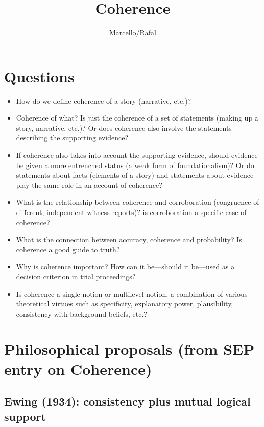 \documentclass[
  11pt,
  dvipsnames,enabledeprecatedfontcommands]{scrartcl}
\title{Coherence}
\author{Marcello/Rafal}
\date{}
\begin{document}
\maketitle

\hypertarget{questions}{%
\section{Questions}\label{questions}}

\begin{itemize}
\item
  How do we define coherence of a story (narrative, etc.)?
\item
  Coherence of what? Is just the coherence of a set of statements
  (making up a story, narrative, etc.)? Or does coherence also involve
  the statements describing the supporting evidence?
\item
  If coherence also takes into account the supporting evidence, should
  evidence be given a more entrenched status (a weak form of
  foundationalism)? Or do statements about facts (elements of a story)
  and statements about evidence play the same role in an account of
  coherence?
\item
  What is the relationship between coherence and corroboration
  (congruence of different, independent witness reports)? is
  corroboration a specific case of coherence?
\item
  What is the connection between accuracy, coherence and probability? Is
  coherence a good guide to truth?
\item
  Why is coherence important? How can it be---should it be---used as a
  decision criterion in trial proceedings?
\item
  Is coherence a single notion or multilevel notion, a combination of
  various theoretical virtues such as specificity, explanatory power,
  plausibility, consistency with background beliefs, etc.?
\end{itemize}

\hypertarget{philosophical-proposals-from-sep-entry-on-coherence}{%
\section{Philosophical proposals (from SEP entry on
Coherence)}\label{philosophical-proposals-from-sep-entry-on-coherence}}

\hypertarget{ewing-1934-consistency-plus-mutual-logical-support}{%
\subsection{Ewing (1934): consistency plus mutual logical
support}\label{ewing-1934-consistency-plus-mutual-logical-support}}
\end{document}
